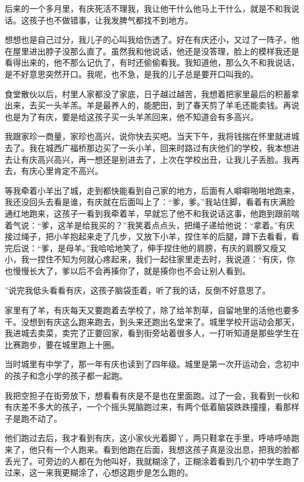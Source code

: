 \documentclass[12pt,UTF8]{ctexbook}
\begin{document}
后来的一个多月里，有庆死活不理我，我让他干什么他马上干什么，就是不和我说话。这孩子也不做错事，让我发脾气都找不到地方。

想想也是自己过分，我儿子的心叫我给伤透了。好在有庆还小，又过了一阵子，他在屋里进出脖子没那么直了。虽然我和他说话，他还是没答理，脸上的模样我还是看得出来的，他不那么记仇了，有时还偷偷看我。我知道他，那么久不和我说话，是不好意思突然开口。我呢，也不急，是我的儿子总是要开口叫我的。

食堂散伙以后，村里人家都没了家底，日子越过越苦，我想着把家里最后的积蓄拿出来，去买一头羊羔。羊是最养人的，能肥田，到了春天剪了羊毛还能卖钱。再说也是为了有庆，要是给这孩子买一头羊羔回来，他不知道会有多高兴。

我跟家珍一商量，家珍也高兴，说你快去买吧。当天下午，我将钱揣在怀里就进城去了。我在城西广福桥那边买了一头小羊，回来时路过有庆他们的学校，我本想进去让有庆高兴高兴，再一想还是别进去了，上次在学校出丑，让我儿子丢脸。我再去，有庆心里肯定不高兴。

等我牵着小羊出了城，走到都快能看到自己家的地方，后面有人噼噼啪啪地跑来，我还没回头去看是谁，有庆就在后面叫上了：“爹，爹。”我站住脚，看着有庆满脸通红地跑来，这孩子一看到我牵着羊，早就忘了他不和我说话这事，他跑到跟前喘着气说：“爹，这羊是给我买的？”我笑着点点头，把绳子递给他说：“拿着。”有庆接过绳子，把小羊抱起来走了几步，又放下小羊，捏住羊的后腿，蹲下去看看，看完后说：“爹，是母羊。”我哈哈地笑了，伸手捏住他的肩膀，有庆的肩膀又瘦又小，我一捏住不知为何就心疼起来，我们一起往家里走去时，我说道：“有庆，你也慢慢长大了，爹以后不会再揍你了，就是揍你也不会让别人看到。


”说完我低头看看有庆，这孩子脑袋歪着，听了我的话，反倒不好意思了。

家里有了羊，有庆每天又要跑着去学校了，除了给羊割草，自留地里的活他也要多干。没想到有庆这么跑来跑去，到头来还跑出名堂来了。城里学校开运动会那天，我进城去卖菜，卖完了正要回家，看到街旁站着很多人，一打听知道是那些学生在比赛跑步，要在城里跑上十圈。

当时城里有中学了，那一年有庆也读到了四年级。城里是第一次开运动会，念初中的孩子和念小学的孩子都一起跑。

我把空担子在街旁放下，想看看有庆是不是也在里面跑。过了一会，我看到一伙和有庆差不多大的孩子，一个个摇头晃脑跑过来，有两个低着脑袋跌跌撞撞，看那样子是跑不动了。

他们跑过去后，我才看到有庆，这小家伙光着脚丫，两只鞋拿在手里，呼哧呼哧跑来了，他只有一个人跑来。看到他跑在后面，我想这孩子真是没出息，把我的脸都丢光了。可旁边的人都在为他叫好，我就糊涂了，正糊涂着看到几个初中学生跑了过来，这一来我更糊涂了，心想这跑步是怎么跑的。
\end{document}
